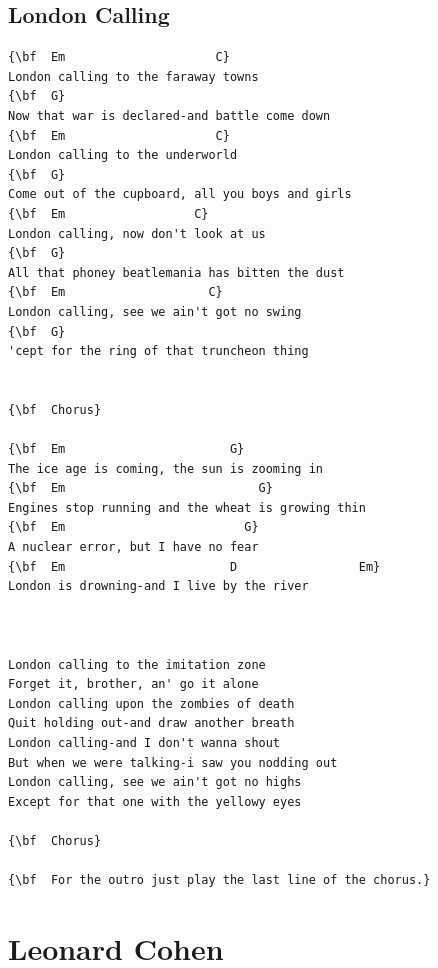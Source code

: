 \documentclass[a4paper]{article}
\begin{document}
\subsection{London Calling}
\begin{Verbatim}[commandchars=\\\{\}]
{\bf  Em                     C}
London calling to the faraway towns
{\bf  G}
Now that war is declared-and battle come down
{\bf  Em                     C}
London calling to the underworld
{\bf  G}
Come out of the cupboard, all you boys and girls
{\bf  Em                  C}
London calling, now don't look at us
{\bf  G}
All that phoney beatlemania has bitten the dust
{\bf  Em                    C}
London calling, see we ain't got no swing
{\bf  G}
'cept for the ring of that truncheon thing


{\bf  Chorus}

{\bf  Em                       G}
The ice age is coming, the sun is zooming in
{\bf  Em                           G}
Engines stop running and the wheat is growing thin
{\bf  Em                         G}
A nuclear error, but I have no fear
{\bf  Em                       D                 Em}
London is drowning-and I live by the river



London calling to the imitation zone
Forget it, brother, an' go it alone
London calling upon the zombies of death
Quit holding out-and draw another breath
London calling-and I don't wanna shout
But when we were talking-i saw you nodding out
London calling, see we ain't got no highs
Except for that one with the yellowy eyes

{\bf  Chorus}

{\bf  For the outro just play the last line of the chorus.}

\end{Verbatim}
\newpage
\section{Leonard Cohen}
\end{document}
